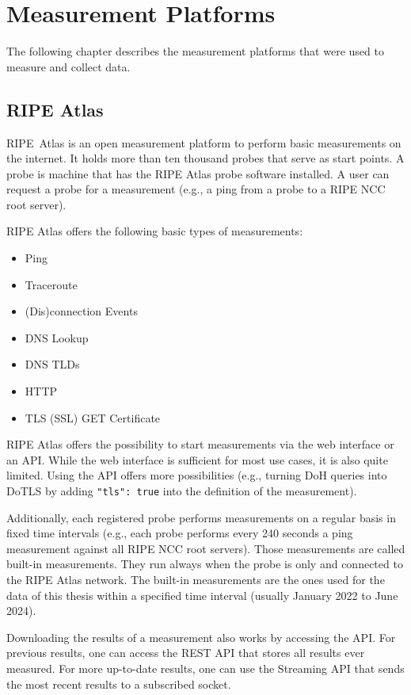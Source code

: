 \section{Measurement Platforms} \label{sec:measurement-platforms}

The following chapter describes the measurement platforms that were used to
measure and collect data.

\subsection{RIPE Atlas} \label{sec:ripe-atlas}

RIPE~Atlas is an open measurement platform to perform basic measurements on the
internet. It holds more than ten thousand probes that serve as start points. A
probe is machine that has the RIPE Atlas probe software installed. A user can
request a probe for a measurement (e.g., a ping from a probe to a RIPE NCC root
server).

RIPE Atlas offers the following basic types of measurements:

\begin{itemize}
	\item Ping
	\item Traceroute
	\item (Dis)connection Events
	\item DNS Lookup
	\item DNS TLDs
	\item HTTP
	\item TLS (SSL) GET Certificate
\end{itemize}

RIPE Atlas offers the possibility to start measurements via the web interface
or an API. While the web interface is sufficient for most use cases, it is also
quite limited. Using the API offers more possibilities (e.g., turning DoH
queries into DoTLS by adding \verb|"tls": true| into the definition of the
measurement).

Additionally, each registered probe performs measurements on a regular basis in
fixed time intervals (e.g., each probe performs every 240 seconds a ping
measurement against all RIPE NCC root servers). Those measurements are called
built-in measurements. They run always when the probe is only and connected to
the RIPE Atlas network. The built-in measurements are the ones used for the
data of this thesis within a specified time interval (usually January 2022 to
June 2024).

Downloading the results of a measurement also works by accessing the API. For
previous results, one can access the REST API that stores all results ever
measured. For more up-to-date results, one can use the Streaming API that sends
the most recent results to a subscribed socket.

